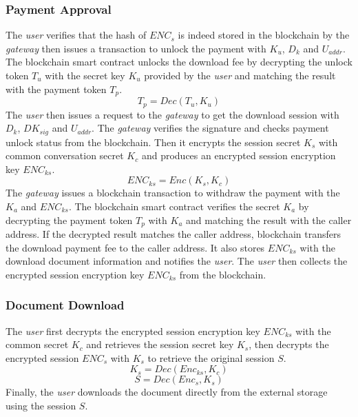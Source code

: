 \subsubsection{Payment Approval}
The {\it user} verifies that the hash of $ENC_s$ is indeed stored in the blockchain by the {\it gateway} then issues a transaction to unlock the payment with $K_u$, $D_k$ and $U_{addr}$. The blockchain smart contract unlocks the download fee by decrypting the unlock token $T_u$ with the secret key $K_u$ provided by the {\it user} and matching the result with the payment token $T_p$. 
\begin{equation}
\label{eq-d-6} 
T_p = Dec (T_u, K_u)
\end{equation}
The {\it user} then issues a request to the {\it gateway} to get the download session with $D_k$, $DK_{sig}$ and $U_{addr}$. The {\it gateway} verifies the signature and checks payment unlock status from the  blockchain. Then it encrypts the session secret $K_s$ with common conversation secret $K_c$ and produces an encrypted session encryption key $ENC_{ks}$.
\begin{equation}
\label{eq-d-7} 
ENC_{ks} = Enc (K_s, K_c)
\end{equation}
The {\it gateway} issues a blockchain transaction to withdraw the payment with the $K_a$ and $ENC_{ks}$. The blockchain smart contract verifies the secret $K_a$ by decrypting the payment token $T_p$ with $K_a$ and matching the result with the caller address. If the decrypted result matches the caller address, blockchain transfers the download payment fee to the caller address. It also stores $ENC_{ks}$ with the download document information and notifies the {\it user}. The {\it user} then collects the encrypted session encryption key $ENC_{ks}$ from the blockchain.

\subsubsection{Document Download}
The {\it user} first decrypts the encrypted session encryption key $ENC_{ks}$ with the common secret $K_c$ and retrieves the session secret key $K_s$, then decrypts the encrypted session $ENC_s$ with $K_s$ to retrieve the original session $S$.
\begin{equation}
\label{eq-d-8} 
K_s = Dec (Enc_{ks}, K_c)
\end{equation}
\begin{equation}
\label{eq-d-9} 
S = Dec (Enc_s, K_s)
\end{equation}
Finally, the {\it user} downloads the document directly from the external storage using the session $S$.

